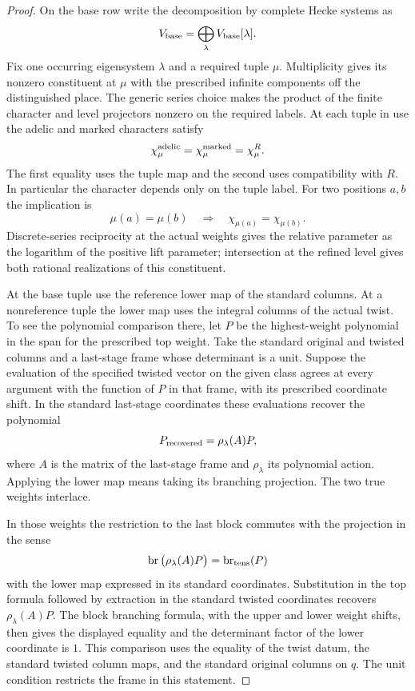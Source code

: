 \begin{proof}
On the base row write the decomposition by complete Hecke systems as
\[
 V_{\rm base}=\bigoplus_{\lambda}V_{\rm base}[\lambda].
\] Fix one
occurring eigensystem \(\lambda\) and a required tuple \(\mu\).
Multiplicity gives its nonzero constituent at \(\mu\) with
the prescribed infinite components off the distinguished place.
The generic series choice makes the product of the finite
character and level projectors nonzero on the required labels.
At each tuple in use the adelic and marked characters satisfy
\[
 \chi^{\rm adelic}_\mu=\chi^{\rm marked}_\mu=\chi^R_\mu .
\]
The first equality uses the tuple map and the second uses
compatibility with \(R\). In particular the character depends only on the tuple label. For two positions \(a,b\) the implication is
\[
 \mu(a)=\mu(b)\quad\Longrightarrow\quad \chi_{\mu(a)}=\chi_{\mu(b)} .
\] Discrete-series reciprocity at the actual
weights gives the relative parameter as the logarithm of the
positive lift parameter; intersection at the refined level gives
both rational realizations of this constituent. \label{cor:completed-division-2}


At the base tuple use the reference lower map of the
standard columns. At a nonreference tuple the lower map uses
the integral columns of the actual twist. To see the
polynomial comparison there, let \(P\) be the highest-weight
polynomial in the span for the prescribed top weight. Take
the standard original and twisted columns and a last-stage
frame whose determinant is a unit.
Suppose the evaluation of the specified twisted vector on the
given class agrees at every argument with the function of \(P\)
in that frame, with its prescribed coordinate shift. In the standard last-stage coordinates these evaluations recover the polynomial
\[
 P_{\rm recovered}=\rho_\lambda(A)P,
\]
where \(A\) is the matrix of the last-stage frame and \(\rho_\lambda\) its polynomial action. Applying the lower
map means taking its branching projection. The two true
weights interlace.

In those weights the restriction to the
last block commutes with the projection in the sense
\[
                 \operatorname{br}\big(\rho_{\lambda}(A)P\big)
                  =\operatorname{br}_{\rm tens}(P)
\]
with the lower map expressed in its standard coordinates.
Substitution in the top formula followed by extraction in the standard twisted coordinates recovers \(\rho_\lambda(A)P\). The block branching formula, with the upper and
lower weight shifts, then gives the displayed equality and
the determinant factor of the lower coordinate is \(1\).
This comparison uses the equality of the twist datum, the
standard twisted column maps, and the standard original
columns on \(q\). The unit condition restricts the frame in this statement.


\end{proof}
